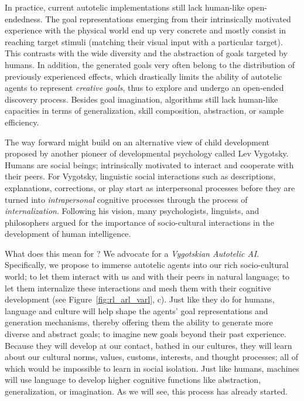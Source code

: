 In practice, current autotelic \rl implementations still lack human-like open-endedness. The goal representations emerging from their intrinsically motivated experience with the physical world end up very concrete and mostly consist in reaching target stimuli (\eg matching their visual input with a particular target).\cite{colas2021intrinsically} This contrasts with the wide diversity and the abstraction of goals targeted by humans. In addition, the generated goals very often belong to the distribution of previously experienced effects, which drastically limits the ability of autotelic agents to represent \textit{creative goals}, thus to explore and undergo an open-ended discovery process.\cite{colas_language_2020} Besides goal imagination, \rl algorithms still lack human-like capacities in terms of generalization, skill composition, abstraction, or sample efficiency.\cite{witty2021measuring,shanahan2022abstraction} 

The way forward might build on an alternative view of child development proposed by another pioneer of developmental psychology called Lev Vygotsky. Humans are social beings; intrinsically motivated to interact and cooperate with their peers.\cite{tomasello_cultural_1999,tomasello_understanding_2005, brewer2014addressing} For Vygotsky, linguistic social interactions such as descriptions, explanations, corrections, or play start as interpersonal processes before they are turned into \textit{intrapersonal} cognitive processes through the process of \textit{internalization}.\cite{vygotsky_thought_1934} Following his vision, many psychologists,\cite{berk_why_1994,lupyan_what_2012,gentner_analogy_2017} linguists,\cite{whorf_language_1956,rumelhart_sequential_1986,lakoff2008metaphors} and philosophers \cite{hesse1988cognitive,dennett_consciousness_1993,carruthers_magic_1998,carruthers_modularity_2002} argued for the importance of socio-cultural interactions in the development of human intelligence. 

What does this mean for \ai? We advocate for a \textit{Vygotskian Autotelic AI}. Specifically, we propose to immerse autotelic agents into our rich socio-cultural world; to let them interact with us and with their peers in natural language; to let them internalize these interactions and mesh them with their cognitive development (see Figure~\ref{fig:rl_arl_varl}, c). Just like they do for humans, language and culture will help shape the agents' goal representations and generation mechanisms, thereby offering them the ability to generate more diverse and abstract goals; to imagine new goals beyond their past experience. Because they will develop at our contact, bathed in our cultures, they will learn about our cultural norms, values, customs, interests, and thought processes; all of which would be impossible to learn in social isolation. Just like humans, machines will use language to develop higher cognitive functions like abstraction, generalization, or imagination.\cite{carruthers_language_1998, gentner_analogy_2017, dove_language_2018} As we will see, this process has already started. 

